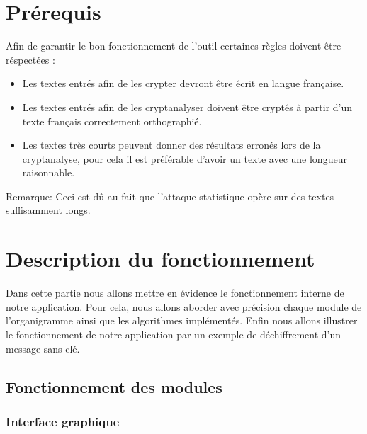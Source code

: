 \documentclass[11pt]{article}
\begin{document}
\section{Prérequis}
Afin de garantir le bon fonctionnement de l'outil certaines règles doivent être réspectées :
\begin{itemize}[label=\textbullet]
   \item Les textes entrés afin de les crypter devront être écrit en langue française. 
   \item Les textes entrés afin de les cryptanalyser doivent être cryptés à partir d'un texte français correctement orthographié.
   \item Les textes très courts peuvent donner des résultats erronés lors de la cryptanalyse, pour cela il est préférable d'avoir un texte avec une longueur raisonnable. 
\end{itemize}
Remarque: Ceci est dû au fait que l'attaque statistique opère sur des textes suffisamment longs.

\section{Description du fonctionnement}

Dans cette partie nous allons mettre en évidence le fonctionnement interne de notre application. Pour cela, nous allons aborder avec précision chaque module de l’organigramme ainsi que les algorithmes implémentés. Enfin nous allons illustrer le fonctionnement de notre application par un exemple de déchiffrement d’un message sans clé. 

\subsection{Fonctionnement des modules}

\subsubsection{Interface graphique}
\end{document}
